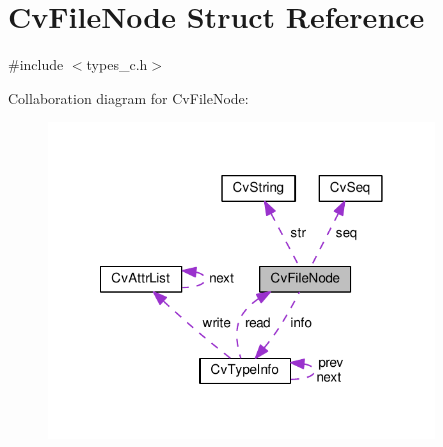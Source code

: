 \hypertarget{structCvFileNode}{\section{Cv\-File\-Node Struct Reference}
\label{structCvFileNode}
}


{\ttfamily \#include $<$types\-\_\-c.\-h$>$}



Collaboration diagram for Cv\-File\-Node\-:\nopagebreak
\begin{figure}[H]
\begin{center}
\leavevmode
\includegraphics[width=290pt]{structCvFileNode__coll__graph}
\end{center}
\end{figure}

